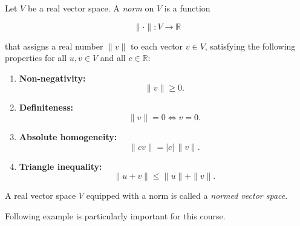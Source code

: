 \begin{definition}
	Let \(V\) be a real vector space. A \emph{norm} on \(V\) is a function

	\[
		\|\cdot\|:V\longrightarrow \mathbb{R}
	\]

	that assigns a real number \(\|v\|\) to each vector \(v\in V\), satisfying the
	following properties for all \(u,v\in V\) and all \(c\in\mathbb{R}\):

	\begin{enumerate}
		\item \textbf{Non-negativity:}
		      \begin{equation}
			      \|v\|\geq 0.
			      \label{eq:norm-on-a-vector-space-1}
		      \end{equation}

		\item \textbf{Definiteness:}
		      \begin{equation}
			      \|v\|=0 \iff v=0.
			      \label{eq:norm-on-a-vector-space-2}
		      \end{equation}

		\item \textbf{Absolute homogeneity:}
		      \begin{equation}
			      \|cv\|=|c|\,\|v\|.
			      \label{eq:norm-on-a-vector-space-3}
		      \end{equation}

		\item \textbf{Triangle inequality:}
		      \begin{equation}
			      \|u+v\|\leq \|u\|+\|v\|.
			      \label{eq:norm-on-a-vector-space-4}
		      \end{equation}
	\end{enumerate}

	A real vector space \(V\) equipped with a norm is called a \emph{normed vector space}.
\end{definition}

Following example is particularly important for this course.

